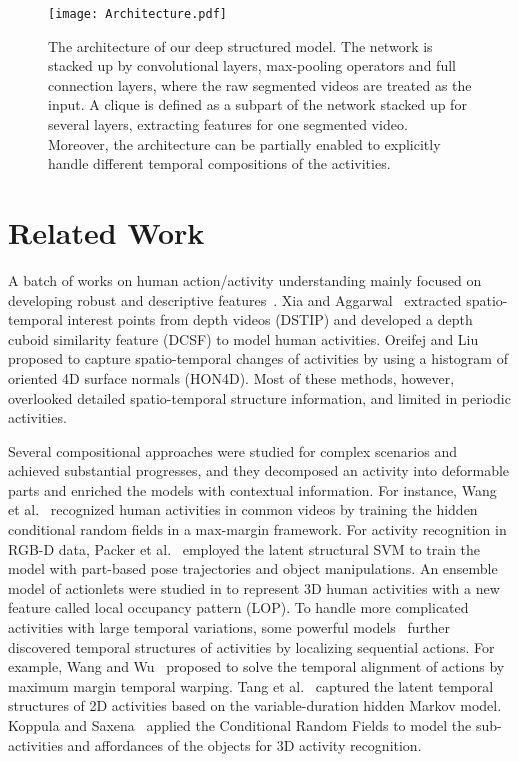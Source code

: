 \documentclass{sig-alternate}
\begin{document}
\begin{figure*}[!ht]
\centering
\texttt{[image: Architecture.pdf]}
\caption{ The architecture of our deep structured model.  The network is stacked up by convolutional layers, max-pooling operators and full connection layers, where the raw segmented videos are treated as the input. A clique is defined as a subpart of the network stacked up for several layers, extracting features for one segmented video. Moreover, the architecture can be partially enabled to explicitly handle different temporal compositions of the activities. }\label{fig:Architecture}
\end{figure*}

\section{Related Work}


A batch of works on human action/activity understanding mainly focused on developing robust and descriptive features~\cite{DSTIP,diMM13,HON4D,FG2013,BagSIFT,DMMM12, 3dsiftMM07}. Xia and Aggarwal~\cite{DSTIP} extracted spatio-temporal interest points from depth videos (DSTIP) and developed a depth cuboid similarity feature (DCSF) to model human activities. Oreifej and Liu~\cite{HON4D} proposed to capture spatio-temporal changes of activities by using a histogram of oriented 4D surface normals (HON4D). Most of these methods, however, overlooked detailed spatio-temporal structure information, and limited in periodic activities.


Several compositional approaches were studied for complex scenarios and achieved substantial progresses\cite{WangPAMI2011,AlanCVPR2013,MMPose2013,CVPR12PoseObject,JCorsoCVPR2012,WuYingCVPR2012,shuichengMM2011,PRLEvent}, and they decomposed an activity into deformable parts and enriched the models with contextual information. For instance, Wang et al.~\cite{WangPAMI2011} recognized human activities in common videos by training the hidden conditional random fields in a max-margin framework. For activity recognition in RGB-D data, Packer et al.~\cite{CVPR12PoseObject} employed the latent structural SVM to train the model with part-based pose trajectories and object manipulations. An ensemble model of actionlets were studied in \cite{WuYingCVPR2012} to represent 3D human activities with a new feature called local occupancy pattern (LOP).  To handle more complicated activities with large temporal variations, some powerful models~\cite{FeifeiCVPR2012,WuYingICCV2013,SinisaICCV2011} further discovered temporal structures of activities by localizing sequential actions. For example, Wang and Wu~\cite{WuYingICCV2013} proposed to solve the temporal alignment of actions by maximum margin temporal warping. Tang et al.~\cite{FeifeiCVPR2012} captured the latent temporal structures of 2D activities based on the variable-duration hidden Markov model. Koppula and Saxena~\cite{SaxenaICML2013} applied the Conditional Random Fields to model the sub-activities and affordances of the objects for 3D activity recognition.
\end{document}
